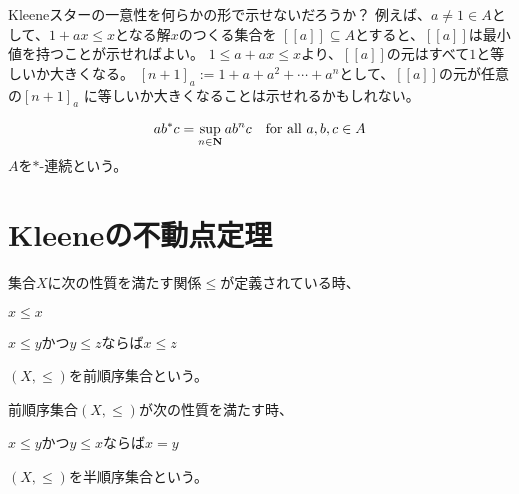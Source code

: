 {	\begin{todo}[Kleeneスターの一意性]\label{todo:Kleeneスターの一意性} %
		Kleeneスターの一意性を何らかの形で示せないだろうか？
		例えば、$a\neq1\in A$として、$1+ax\le x$となる解$x$のつくる集合を
		$[[a]]\subseteq A$とすると、$[[a]]$は最小値を持つことが示せればよい。
		$1\le a+ax\le x$より、$[[a]]$の元はすべて$1$と等しいか大きくなる。
		$[n+1]_a:=1+a+a^2+\cdots+a^n$として、$[[a]]$の元が任意の$[n+1]_a$
		に等しいか大きくなることは示せれるかもしれない。\EOP
	\end{todo} %

	\begin{equation*}\begin{split}
		ab^*c = \sup_{n\in\mathbf{N}}ab^nc \quad\text{for all } a,b,c\in A
	\end{split}\end{equation*}
	$A$を$*$-連続という。
\section{Kleeneの不動点定理}\label{s1:Kleeneの不動点定理} %
	\begin{definition}[前順序集合]\label{def:前順序集合} %
		集合$X$に次の性質を満たす関係$\le$が定義されている時、
		\begin{description}\setlength{\itemsep}{-1mm} %
			\item[反射性] $x\le x$
			\item[結合性] $x\le y$かつ$y\le z$ならば$x\le z$
		\end{description} %
		$(X,\le)$を前順序集合という。\EOP
	\end{definition} %

	\begin{definition}[半順序集合]\label{def:半順序集合} %
		前順序集合$(X,\le)$が次の性質を満たす時、
		\begin{description}\setlength{\itemsep}{-1mm} %
			\item[対称性] $x\le y$かつ$y\le x$ならば$x = y$
		\end{description} %
		$(X,\le)$を半順序集合という。\EOP
	\end{definition} %

}
